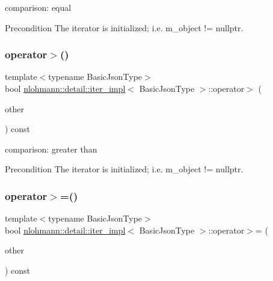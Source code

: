 comparison\+: equal 

\begin{DoxyPrecond}{Precondition}
The iterator is initialized; i.\+e. {\ttfamily m\+\_\+object != nullptr}. 
\end{DoxyPrecond}
\mbox{\label{classnlohmann_1_1detail_1_1iter__impl_aaf3620b8dfa4bed8a9ac2b51dd55dbd7}} 
\subsubsection{\texorpdfstring{operator$>$()}{operator>()}}
{\footnotesize\ttfamily template$<$typename Basic\+Json\+Type$>$ \\
bool \mbox{\hyperlink{classnlohmann_1_1detail_1_1iter__impl}{nlohmann\+::detail\+::iter\+\_\+impl}}$<$ Basic\+Json\+Type $>$\+::operator$>$ (\begin{DoxyParamCaption}\item[{const \mbox{\hyperlink{classnlohmann_1_1detail_1_1iter__impl}{iter\+\_\+impl}}$<$ Basic\+Json\+Type $>$ \&}]{other }\end{DoxyParamCaption}) const\hspace{0.3cm}{\ttfamily [inline]}}



comparison\+: greater than 

\begin{DoxyPrecond}{Precondition}
The iterator is initialized; i.\+e. {\ttfamily m\+\_\+object != nullptr}. 
\end{DoxyPrecond}
\mbox{\label{classnlohmann_1_1detail_1_1iter__impl_a634f85da575cb60b012a687efa26e11a}} 
\subsubsection{\texorpdfstring{operator$>$=()}{operator>=()}}
{\footnotesize\ttfamily template$<$typename Basic\+Json\+Type$>$ \\
bool \mbox{\hyperlink{classnlohmann_1_1detail_1_1iter__impl}{nlohmann\+::detail\+::iter\+\_\+impl}}$<$ Basic\+Json\+Type $>$\+::operator$>$= (\begin{DoxyParamCaption}\item[{const \mbox{\hyperlink{classnlohmann_1_1detail_1_1iter__impl}{iter\+\_\+impl}}$<$ Basic\+Json\+Type $>$ \&}]{other }\end{DoxyParamCaption}) const\hspace{0.3cm}{\ttfamily [inline]}}



